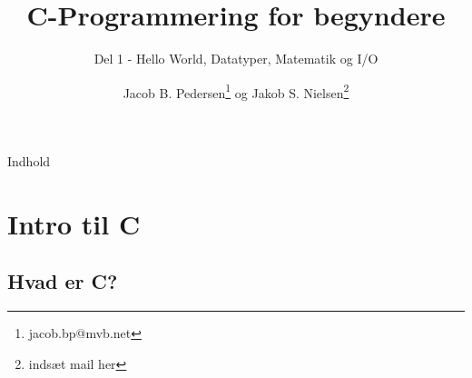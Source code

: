 \documentclass{beamer}
\title{C-Programmering for begyndere}
\subtitle{Del 1 - Hello World, Datatyper, Matematik og I/O}
\author{Jacob B. Pedersen\footnote{jacob.bp@mvb.net} og Jakob S. Nielsen\footnote{indsæt mail her}}
\begin{document}
\begin{frame}
	\maketitle
\end{frame}

\begin{frame}{Indhold}
	\tableofcontents
\end{frame}

\section{Intro til C}
\subsection{Hvad er C?}
\end{document}
